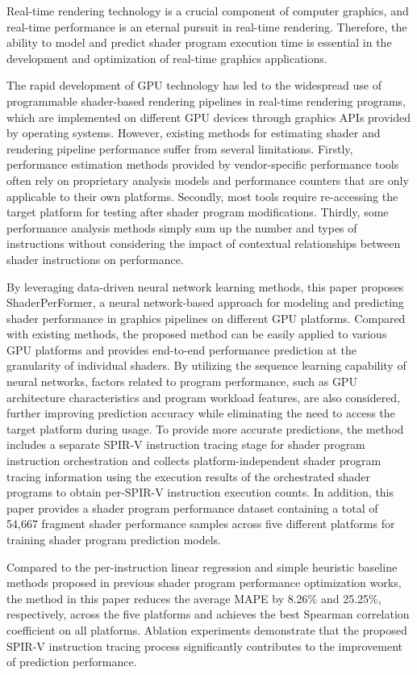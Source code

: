 \begin{abstract*}
Real-time rendering technology is a crucial component of computer graphics, and real-time performance is an eternal pursuit in real-time rendering. Therefore, the ability to model and predict shader program execution time is essential in the development and optimization of real-time graphics applications.

The rapid development of GPU technology has led to the widespread use of programmable shader-based rendering pipelines in real-time rendering programs, which are implemented on different GPU devices through graphics APIs provided by operating systems. However, existing methods for estimating shader and rendering pipeline performance suffer from several limitations. Firstly, performance estimation methods provided by vendor-specific performance tools often rely on proprietary analysis models and performance counters that are only applicable to their own platforms. Secondly, most tools require re-accessing the target platform for testing after shader program modifications. Thirdly, some performance analysis methods simply sum up the number and types of instructions without considering the impact of contextual relationships between shader instructions on performance.

By leveraging data-driven neural network learning methods, this paper proposes ShaderPerFormer, a neural network-based approach for modeling and predicting shader performance in graphics pipelines on different GPU platforms. Compared with existing methods, the proposed method can be easily applied to various GPU platforms and provides end-to-end performance prediction at the granularity of individual shaders. By utilizing the sequence learning capability of neural networks, factors related to program performance, such as GPU architecture characteristics and program workload features, are also considered, further improving prediction accuracy while eliminating the need to access the target platform during usage. To provide more accurate predictions, the method includes a separate SPIR-V instruction tracing stage for shader program instruction orchestration and collects platform-independent shader program tracing information using the execution results of the orchestrated shader programs to obtain per-SPIR-V instruction execution counts. In addition, this paper provides a shader program performance dataset containing a total of 54,667 fragment shader performance samples across five different platforms for training shader program prediction models.

Compared to the per-instruction linear regression and simple heuristic baseline methods proposed in previous shader program performance optimization works, the method in this paper reduces the average MAPE by 8.26\% and 25.25\%, respectively, across the five platforms and achieves the best Spearman correlation coefficient on all platforms. Ablation experiments demonstrate that the proposed SPIR-V instruction tracing process significantly contributes to the improvement of prediction performance.
\end{abstract*}
